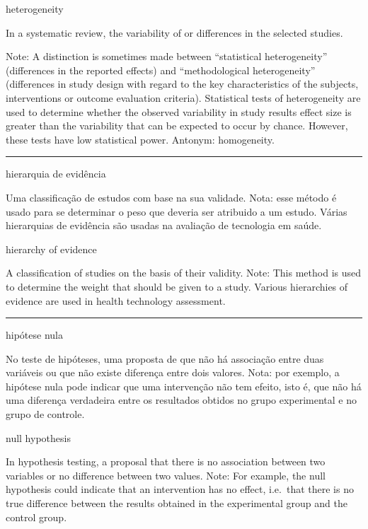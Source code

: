 \documentclass[
  openany]{book}
\begin{document}
heterogeneity

In a systematic review, the variability of or differences in the selected studies.

Note: A distinction is sometimes made between ``statistical heterogeneity'' (differences in the reported effects) and ``methodological heterogeneity'' (differences in study design with regard to the key characteristics of the subjects, interventions or outcome evaluation criteria). Statistical tests of heterogeneity are used to determine whether the observed variability in study results effect size is greater than the variability that can be expected to occur by chance. However, these tests have low statistical power. Antonym: homogeneity.

\begin{center}\rule{0.5\linewidth}{0.5pt}\end{center}

hierarquia de evidência

Uma classificação de estudos com base na sua validade. Nota: esse método é usado para se determinar o peso que deveria ser atribuido a um estudo. Várias hierarquias de evidência são usadas na avaliação de tecnologia em saúde.

hierarchy of evidence

A classification of studies on the basis of their validity. Note: This method is used to determine the weight that should be given to a study. Various hierarchies of evidence are used in health technology assessment.

\begin{center}\rule{0.5\linewidth}{0.5pt}\end{center}

hipótese nula

No teste de hipóteses, uma proposta de que não há associação entre duas variáveis ou que não existe diferença entre dois valores. Nota: por exemplo, a hipótese nula pode indicar que uma intervenção não tem efeito, isto é, que não há uma diferença verdadeira entre os resultados obtidos no grupo experimental e no grupo de controle.

null hypothesis

In hypothesis testing, a proposal that there is no association between two variables or no difference between two values. Note: For example, the null hypothesis could indicate that an intervention has no effect, i.e.~that there is no true difference between the results obtained in the experimental group and the control group.
\end{document}
